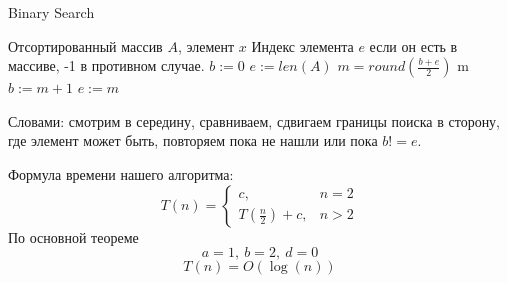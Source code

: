 \documentclass[../main.tex]{subfiles}
\begin{document}
	\begin{algorithm}[H]
		\caption{Binary Search}
		\begin{algorithmic}[1]
			\Require Отсортированный массив $A$, элемент $x$
			\Ensure Индекс элемента $e$ если он есть в массиве, -1 в противном случае.
				\State $b := 0$
				\State $e := len(A)$
					\State $m = round(\frac{b + e}{2})$
						\State \Return m
						\State $b := m + 1$
					\Else
						\State $e := m$
					\EndIf
				\EndWhile
				\State {}
			\EndFunction
		\end{algorithmic}
	\end{algorithm}
	
	Словами: смотрим в середину, сравниваем, сдвигаем границы поиска в сторону, где элемент может быть, повторяем пока не нашли или пока $b != e$.
	
	
	\begin{time}
		Формула времени нашего алгоритма:
		\[
		T(n) = 
		\begin{cases}
			c, & n = 2 \\
			T(\frac{n}{2}) + c, & n > 2
		\end{cases}
		\]
		По основной теореме 
		\[
		a = 1, \ b = 2, \ d = 0
		\]
		\[
		T(n) = O(\log(n))
		\]
	\end{time}
	
	
	
	\pagebreak
	
\end{document}
